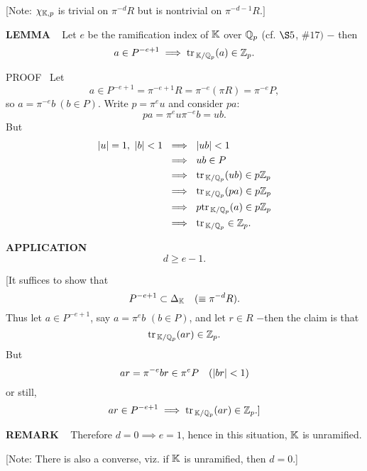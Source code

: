 \vspace{0.1cm}

[Note: $\chi_{\mathbb{K},p}$ is trivial on $\pi^{-d}R$ but is nontrivial on $\pi^{-d-1}R.]$

\vspace{0.2cm}

\begin{x}{\small\bf LEMMA} \ %
Let $e$ be the ramification index of $\mathbb{K}$ over $\mathbb{Q}_p$ (cf. $\S5$, $\#17)$ $-$ then
\[
a \in P^{-e+1} \implies \text{tr}\hspace{0.05cm}_{\mathbb{K}/ \mathbb{Q}_p}(a) \in \mathbb{Z}_p.
\]

\vspace{0.1cm}

PROOF \  Let
\[
a \in P^{-e+1} = \pi^{-e+1}R = \pi^{-e}(\pi R) =  \pi^{-e}P,
\]
so $a = \pi^{-e}b \ (b \in P)$.  
Write $p = \pi^eu$ and consider $pa$:
\[
pa = \pi^eu\pi^{-e}b = ub.
\]
But
\begin{align*}
\abs{u} = 1, \  \abs{b} < 1 	\ 
&\implies\  \abs{ub} < 1\\	
&\implies\  ub \in P\\
&\implies\  \tr_{\K/ \Q_p}(ub) \in p\Z_p\\
&\implies\  \tr_{\K/ \Q_p}(pa) \in p\Z_p\\
&\implies\  p\tr_{\K/ \Q_p}(a) \in p\Z_p\\
&\implies\  \tr_{\K/ \Q_p} \in \Z_p.
\end{align*}
\end{x}

\vspace{0.1cm}

\begin{x}{\small\bf APPLICATION} \ %
\[
d \ge e-1.
\]

[It suffices to show that
\[
P^{-e+1} \subset \Delta_{\mathbb{K}} \quad  (\equiv \pi^{-d}R).
\]
Thus let $a \in  P^{-e+1}$, say $a = \pi^eb$  $(b \in P)$, and let $r \in R$ $-$then the claim is that
\[
\text{tr}\hspace{0.05cm}_{\mathbb{K}/ \mathbb{Q}_p}(ar) \in \mathbb{Z}_p.
\]
But
\[
ar = \pi^{-e}br \in \pi^e P \quad (\left\vert br\right\vert < 1)
\]
or still,
\[
ar \in P^{-e+1} \implies \text{tr}\hspace{0.05cm}_{\mathbb{K}/ \mathbb{Q}_p}(ar) \in \mathbb{Z}_p.]
\]
\end{x}

\vspace{0.1cm}

\begin{x}{\small\bf REMARK} \ %
Therefore $d = 0 \implies e = 1$, hence in this situation, $\mathbb{K}$ is unramified.

[Note: There is also a converse, viz. if $\mathbb{K}$ is unramified, then $d = 0.$]
\end{x}

